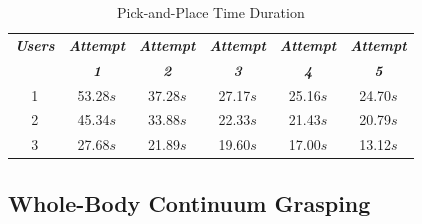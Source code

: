\documentclass[letterpaper, 10 pt, conference]{ieeeconf}  %
\begin{document}
\begin{table}[t!]
\caption{Pick-and-Place Time Duration} 
\label{tab:pickplace_table}
	\begin{tabularx}{0.48\textwidth}{c|c|c|c|c|c}   \toprule\toprule
    \centering
    \small
    \setlength\tabcolsep{11pt}
	\textbf{\emph{Users}} & \textbf{\emph{Attempt  }} & \textbf{\emph{Attempt }} & \textbf{\emph{Attempt }} & \textbf{\emph{Attempt  }} & \textbf{\emph{Attempt }}\\ 
  	
   						 & \textbf{\emph{1 }} 		& 	\textbf{\emph{2}} 			& \textbf{\emph{3 }} & 	\textbf{\emph{4 }} & \textbf{\emph{ 5 }}\\   
    
    \midrule
	1	&	53.28$s$	& 	37.28$s$ 	& 	27.17$s$ 	&	25.16$s$ 	&	24.70$s$ 	\\
   	2  	&	45.34$s$   &  	33.88$s$	& 	22.33$s$ 	&	21.43$s$ 	& 	20.79$s$ 	\\
    3 	&	27.68$s$	&	21.89$s$	&	19.60$s$	&	17.00$s$	&	13.12$s$	\\
    \bottomrule 
    \hline
	\end{tabularx}
    \vspace{-1.5em}
\end{table}







\subsection{Whole-Body Continuum Grasping}
\end{document}
